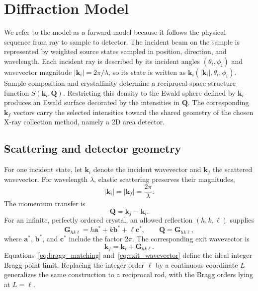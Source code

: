 \section{Diffraction Model}
\label{sec:diffraction_model}
We refer to the model as a forward model because it follows the physical sequence from ray to sample to detector. The incident beam on the sample is represented by weighted source states sampled in position, direction, and wavelength. Each incident ray is described by its incident angles $(\theta_i,\phi_i)$ and wavevector magnitude $|\mathbf{k}_i|=2\pi/\lambda$, so its state is written as $\mathbf{k}_i(|\mathbf{k}_i|,\theta_i,\phi_i)$. Sample composition and crystallinity determine a reciprocal-space structure function $S(\mathbf{k}_i,\mathbf Q)$. Restricting this density to the Ewald sphere defined by $\mathbf{k}_i$ produces an Ewald surface decorated by the intensities in $\mathbf{Q}$. The corresponding $\mathbf{k}_f$ vectors carry the selected intensities toward the shared geometry of the chosen X-ray collection method, namely a 2D area detector.

\subsection{Scattering and detector geometry}
\label{sec:scattering_detector_geometry}
For one incident state, let $\mathbf{k}_i$ denote the incident wavevector and $\mathbf{k}_f$ the scattered wavevector. For wavelength $\lambda$, elastic scattering preserves their magnitudes,
\begin{equation}
  |\mathbf{k}_i|=|\mathbf{k}_f|=\frac{2\pi}{\lambda}.
  \label{eq:elastic_scattering}
\end{equation}
The momentum transfer is
\begin{equation}
  \mathbf Q=\mathbf{k}_f-\mathbf{k}_i.
  \label{eq:momentum_transfer}
\end{equation}
For an infinite, perfectly ordered crystal, an allowed reflection $(h,k,\ell)$ supplies
\begin{equation}
  \mathbf G_{hk\ell}=h\mathbf a^{*}+k\mathbf b^{*}+\ell\mathbf c^{*},
  \qquad \mathbf Q=\mathbf G_{hk\ell},
  \label{eq:bragg_matching}
\end{equation}
where $\mathbf a^{*}$, $\mathbf b^{*}$, and $\mathbf c^{*}$ include the factor $2\pi$. The corresponding exit wavevector is
\begin{equation}
  \mathbf{k}_f=\mathbf{k}_i+\mathbf G_{hk\ell}.
  \label{eq:exit_wavevector}
\end{equation}
Equations~\eqref{eq:bragg_matching} and~\eqref{eq:exit_wavevector} define the ideal integer Bragg-point limit. Replacing the integer order $\ell$ by a continuous coordinate $L$ generalizes the same construction to a reciprocal rod, with the Bragg orders lying at $L=\ell$.

